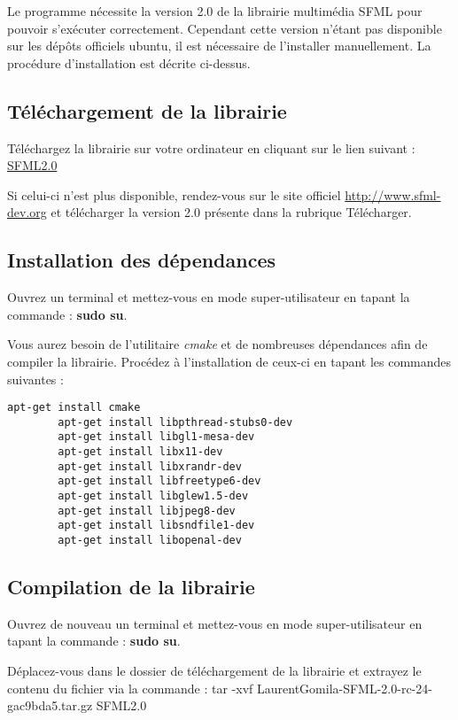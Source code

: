 
	Le programme nécessite la version 2.0 de la librairie multimédia SFML pour pouvoir s'exécuter correctement. Cependant cette version n'étant pas disponible sur les dépôts officiels ubuntu, il est nécessaire de l'installer manuellement. La procédure d'installation est décrite ci-dessus.
	
\subsection{Téléchargement de la librairie}

Téléchargez la librairie sur votre ordinateur en cliquant sur le lien suivant :
\href{https://github.com/LaurentGomila/SFML/tarball/master}{SFML2.0}


Si celui-ci n'est plus disponible, rendez-vous sur le site officiel \href{http://www.sfml-dev.org}{http://www.sfml-dev.org} et télécharger la version 2.0 présente dans la rubrique Télécharger.

\subsection{Installation des dépendances}

Ouvrez un terminal et mettez-vous en mode super-utilisateur en tapant la commande : \textbf{sudo su}.

Vous aurez besoin de l'utilitaire \textit{cmake} et de nombreuses dépendances afin de compiler la librairie. Procédez à l'installation de ceux-ci en tapant les commandes suivantes :
\begin{center}
	\begin{lstlisting}[caption={Installation des dépendances}]
		apt-get install cmake
		apt-get install libpthread-stubs0-dev
		apt-get install libgl1-mesa-dev
		apt-get install libx11-dev
		apt-get install libxrandr-dev
		apt-get install libfreetype6-dev
		apt-get install libglew1.5-dev
		apt-get install libjpeg8-dev
		apt-get install libsndfile1-dev
		apt-get install libopenal-dev
	\end{lstlisting}
\end{center}


\subsection{Compilation de la librairie}

Ouvrez de nouveau un terminal et mettez-vous en mode super-utilisateur en tapant la commande : \textbf{sudo su}.

Déplacez-vous dans le dossier de téléchargement de la librairie et extrayez le contenu du fichier via la commande : tar -xvf LaurentGomila-SFML-2.0-rc-24-gac9bda5.tar.gz SFML2.0

